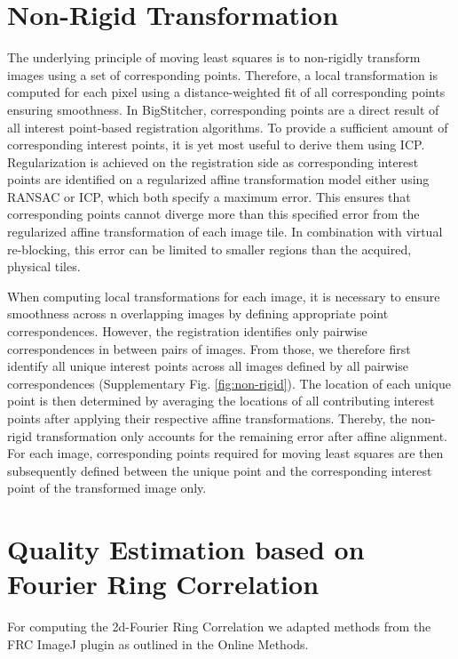 \section{Non-Rigid Transformation}
\label{sec:nonrigid}

The underlying principle of moving least squares\cite{movingleastsquares} is to non-rigidly transform images using a set of corresponding points. Therefore, a local transformation is computed for each pixel using a distance-weighted fit of all corresponding points ensuring smoothness. In BigStitcher, corresponding points are a direct result of all interest point-based registration algorithms. To provide a sufficient amount of corresponding interest points, it is yet most useful to derive them using ICP\cite{icp}. Regularization is achieved on the registration side as corresponding interest points are identified on a regularized affine transformation model either using RANSAC\cite{ransac} or ICP\cite{icp}, which both specify a maximum error. This ensures that corresponding points cannot diverge more than this specified error from the regularized affine transformation of each image tile. In combination with virtual re-blocking, this error can be limited to smaller regions than the acquired, physical tiles. 

When computing local transformations for each image, it is necessary to ensure smoothness across n overlapping images by defining appropriate point correspondences. However, the registration identifies only pairwise correspondences in between pairs of images. From those, we therefore first identify all unique interest points across all images defined by all pairwise correspondences (Supplementary Fig. \ref{fig:non-rigid}). The location of each unique point is then determined by averaging the locations of all contributing interest points after applying their respective affine transformations. Thereby, the non-rigid transformation only accounts for the remaining error after affine alignment. For each image, corresponding points required for moving least squares are then subsequently defined between the unique point and the corresponding interest point of the transformed image only.

\section{Quality Estimation based on Fourier Ring Correlation}
\label{sec:frc}

For computing the 2d-Fourier Ring Correlation\cite{Nieuwenhuizen:2013ko} we adapted methods from the FRC ImageJ plugin\cite{frcij} as outlined in the Online Methods.  


